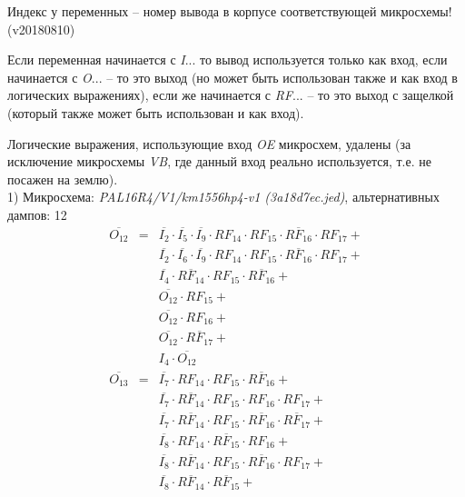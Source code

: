 \documentclass[a4paper,russian]{report}
\begin{document}
Индекс у переменных -- номер вывода в корпусе соответствующей микросхемы!   (v20180810)

Если переменная начинается с \emph{I}... то вывод используется только как вход,
если начинается с \emph{O}... -- то это выход (но может быть использован также
и как вход в логических выражениях), если же начинается с \emph{RF}... --
то это выход с защелкой (который также может быть использован и как вход).

Логические выражения, использующие вход \emph{OE} микросхем, удалены (за исключение
микросхемы \emph{VB}, где данный вход реально используется, т.е. не посажен на землю). \\

1) Микросхема: \emph{PAL16R4/V1/km1556hp4-v1  (3a18d7ec.jed)}, альтернативных дампов: 12
\nopagebreak\begin{eqnarray*}
    \overline{O_{12}} & = & \overline{I_{2}} \cdotp \overline{I_{5}} \cdotp \overline{I_{9}} \cdotp RF_{14} \cdotp RF_{15} \cdotp \overline{RF_{16}} \cdotp RF_{17} + \\
	& &  \overline{I_{2}} \cdotp \overline{I_{6}} \cdotp \overline{I_{9}} \cdotp RF_{14} \cdotp RF_{15} \cdotp \overline{RF_{16}} \cdotp RF_{17} + \\
	& &  \overline{I_{4}} \cdotp \overline{RF_{14}} \cdotp RF_{15} \cdotp \overline{RF_{16}} + \\
	& &  \overline{O_{12}} \cdotp RF_{15} + \\
	& &  \overline{O_{12}} \cdotp RF_{16} + \\
	& &  \overline{O_{12}} \cdotp \overline{RF_{17}} + \\
	& &  I_{4} \cdotp \overline{O_{12}} \\
    \overline{O_{13}} & = & \overline{I_{7}} \cdotp RF_{14} \cdotp RF_{15} \cdotp \overline{RF_{16}} + \\
	& &  \overline{I_{7}} \cdotp \overline{RF_{14}} \cdotp RF_{15} \cdotp RF_{16} \cdotp RF_{17} + \\
	& &  \overline{I_{7}} \cdotp \overline{RF_{14}} \cdotp RF_{15} \cdotp \overline{RF_{16}} \cdotp \overline{RF_{17}} + \\
	& &  \overline{I_{8}} \cdotp RF_{14} \cdotp \overline{RF_{15}} \cdotp RF_{16} + \\
	& &  \overline{I_{8}} \cdotp \overline{RF_{14}} \cdotp RF_{15} \cdotp \overline{RF_{16}} \cdotp RF_{17} + \\
	& &  \overline{I_{8}} \cdotp \overline{RF_{14}} \cdotp \overline{RF_{15}} + \\

\end{eqnarray*}
\end{document}
